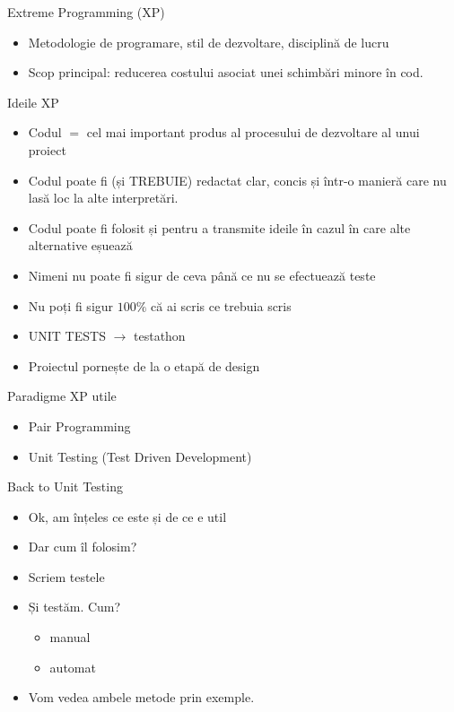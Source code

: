 \documentclass{beamer}
\begin{document}
\begin{frame}{Extreme Programming (XP)}
\begin{itemize}
\item Metodologie de programare, stil de dezvoltare, disciplină de lucru
\item \pause Scop principal: reducerea costului asociat unei schimbări minore în cod.
\end{itemize}
\end{frame}

\begin{frame}{Ideile XP}
\begin{itemize}
\item Codul $=$ cel mai important produs al procesului de dezvoltare al unui proiect
\item \pause Codul poate fi (și TREBUIE) redactat clar, concis și într-o manieră care nu lasă loc la alte interpretări.
\item \pause Codul poate fi folosit și pentru a transmite ideile în cazul în care alte alternative eșuează
\item \pause Nimeni nu poate fi sigur de ceva până ce nu se efectuează teste
\item \pause Nu poți fi sigur $100\%$ că ai scris ce trebuia scris
\item \pause UNIT TESTS $\rightarrow$ testathon
\item \pause Proiectul pornește de la o etapă de design
\end{itemize}
\end{frame}

\begin{frame}{Paradigme XP utile}
\begin{itemize}
\item Pair Programming
\item \pause Unit Testing (Test Driven Development)
\end{itemize}
\end{frame}

\begin{frame}{Back to Unit Testing}
\begin{itemize}
\item Ok, am înțeles ce este și de ce e util
\item \pause Dar cum îl folosim?
\item \pause Scriem testele
\item \pause Și testăm. \pause Cum?
\begin{itemize}
\item manual
\item \pause automat
\end{itemize}
\item \pause Vom vedea ambele metode prin exemple.
\end{itemize}
\end{frame}
\end{document}
